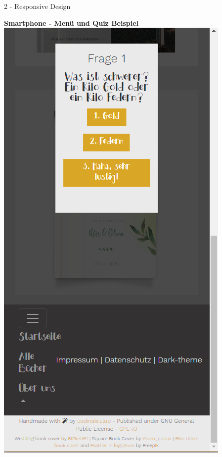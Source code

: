 \documentclass[a4paper]{article}
\begin{document}
\begin{exercise}{2 - Responsive Design}
\begin{flushleft}
{\Large \textbf{Smartphone - Menü und Quiz Beispiel}}\\
\includegraphics[scale=0.5]{../2_bookstore_main_mobile-quiz-menu}\\
\end{flushleft}

\end{exercise}
\end{document}
